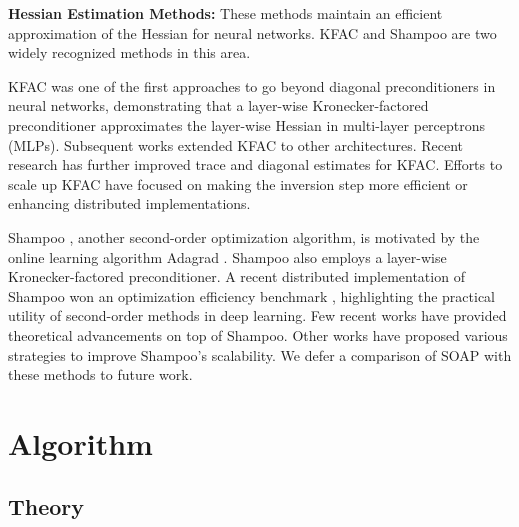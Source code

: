 \documentclass{article} %
\begin{document}
\textbf{Hessian Estimation Methods:} These methods maintain an efficient 
approximation of the Hessian for neural networks. KFAC \citep{martens15} and Shampoo 
\citep{shampoo} are two widely recognized methods in this area.

KFAC \citep{martens15} was one of the first approaches to go beyond diagonal 
preconditioners in neural networks, demonstrating that a layer-wise Kronecker-factored 
preconditioner approximates the layer-wise Hessian in multi-layer perceptrons (MLPs). 
Subsequent works \citep{martens2018kroneckerrecurrent, kazuki19} extended KFAC to other 
architectures. Recent research \citep{ekfac, Gao_Liu_Huang_Wang_Wang_Xu_Yu_2021} has 
further improved trace and diagonal estimates for KFAC. Efforts to scale up KFAC 
\citep{ba2017distributed, Puiu22, puiu2023brandnewkfacsspeeding, eschenhagen2023kroneckerfactored} 
have focused on making the inversion step more efficient or enhancing distributed 
implementations.

Shampoo \citep{shampoo}, another second-order optimization algorithm, is motivated by 
the online learning algorithm Adagrad \citep{JMLR:v12:duchi11a}. Shampoo also employs 
a layer-wise Kronecker-factored preconditioner. A recent distributed implementation of 
Shampoo \citep{distributedshampoo} won an optimization efficiency benchmark 
\citep{dahl2023benchmarking}, highlighting the practical utility of second-order methods 
in deep learning. Few recent works \citep{caspr, whyshampoo} have provided theoretical advancements on top of Shampoo. Other works \citep{anil2020scalable, peirson2022fishy, wulin2024, 
	4bitshampoo} have proposed various strategies to improve Shampoo’s scalability. We defer 
a comparison of SOAP with these methods to future work.

\section{Algorithm}
\label{sec:alg}

\subsection{Theory}
\end{document}
